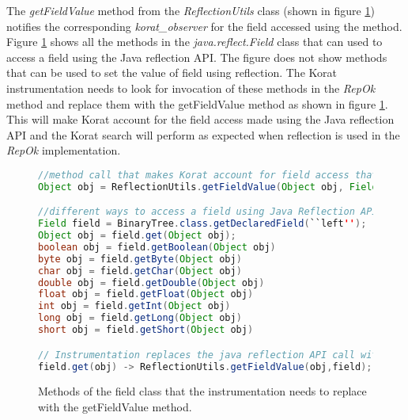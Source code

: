 \para The \emph{getFieldValue} method from the \emph{ReflectionUtils}
class (shown in figure \ref{fig:fieldClassInstrumentationMethods})
notifies the corresponding \emph{korat\_observer} for the field
accessed using the method. Figure
\ref{fig:fieldClassInstrumentationMethods} shows all the methods in
the \emph{java.reflect.Field} class that can used to access a field
using the Java reflection API. The figure does not show methods that
can be used to set the value of field using reflection. The Korat
instrumentation needs to look for invocation of these methods in the
\emph{RepOk} method and replace them with the getFieldValue method as
shown in figure \ref{fig:fieldClassInstrumentationMethods}. This will
make Korat account for the field access made using the Java reflection
API and the Korat search will perform as expected when reflection is
used in the \emph{RepOk} implementation.

\begin{figure}
\centering
\begin{lstlisting}[language=Java]
//method call that makes Korat account for field access that uses the Java reflection API.
Object obj = ReflectionUtils.getFieldValue(Object obj, Field field);

//different ways to access a field using Java Reflection API
Field field = BinaryTree.class.getDeclaredField(``left'');
Object obj = field.get(Object obj);
boolean obj = field.getBoolean(Object obj)
byte obj = field.getByte(Object obj)
char obj = field.getChar(Object obj)
double obj = field.getDouble(Object obj)
float obj = field.getFloat(Object obj)
int obj = field.getInt(Object obj)
long obj = field.getLong(Object obj)
short obj = field.getShort(Object obj)

// Instrumentation replaces the java reflection API call with our API call
field.get(obj) -> ReflectionUtils.getFieldValue(obj,field);
\end{lstlisting}
\caption{Methods of the field class that the instrumentation needs to replace with the getFieldValue method.}
\label{fig:fieldClassInstrumentationMethods}
\end{figure}

